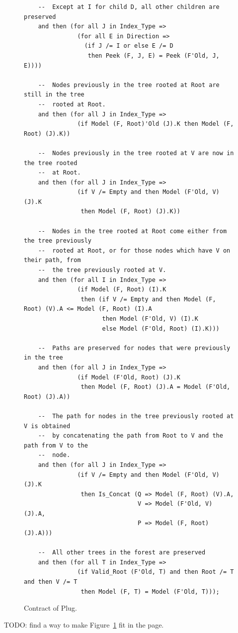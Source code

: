 \documentclass[11pt,a4paper]{article}
\begin{document}
\begin{figure}
\begin{small}
\begin{lstlisting}
    --  Except at I for child D, all other children are preserved
    and then (for all J in Index_Type =>
               (for all E in Direction =>
                 (if J /= I or else E /= D
                  then Peek (F, J, E) = Peek (F'Old, J, E))))

    --  Nodes previously in the tree rooted at Root are still in the tree
    --  rooted at Root.
    and then (for all J in Index_Type =>
               (if Model (F, Root)'Old (J).K then Model (F, Root) (J).K))

    --  Nodes previously in the tree rooted at V are now in the tree rooted
    --  at Root.
    and then (for all J in Index_Type =>
               (if V /= Empty and then Model (F'Old, V) (J).K
                then Model (F, Root) (J).K))

    --  Nodes in the tree rooted at Root come either from the tree previously
    --  rooted at Root, or for those nodes which have V on their path, from
    --  the tree previously rooted at V.
    and then (for all I in Index_Type =>
               (if Model (F, Root) (I).K
                then (if V /= Empty and then Model (F, Root) (V).A <= Model (F, Root) (I).A
                      then Model (F'Old, V) (I).K
                      else Model (F'Old, Root) (I).K)))

    --  Paths are preserved for nodes that were previously in the tree
    and then (for all J in Index_Type =>
               (if Model (F'Old, Root) (J).K
                then Model (F, Root) (J).A = Model (F'Old, Root) (J).A))

    --  The path for nodes in the tree previously rooted at V is obtained
    --  by concatenating the path from Root to V and the path from V to the
    --  node.
    and then (for all J in Index_Type =>
               (if V /= Empty and then Model (F'Old, V) (J).K
                then Is_Concat (Q => Model (F, Root) (V).A,
                                V => Model (F'Old, V) (J).A,
                                P => Model (F, Root) (J).A)))

    --  All other trees in the forest are preserved
    and then (for all T in Index_Type =>
               (if Valid_Root (F'Old, T) and then Root /= T and then V /= T
                then Model (F, T) = Model (F'Old, T)));
\end{lstlisting}
\end{small}
\caption{\label{fig-spec-binary} Contract of Plug.}
\end{figure}
{\color{red} TODO: find a way to make Figure~\ref{fig-spec-binary} fit in the page.}
\end{document}
